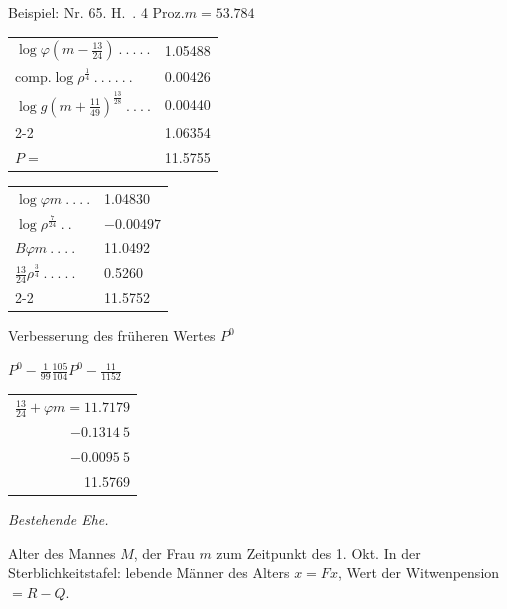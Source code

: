 Beispiel: Nr. 65. H.\ . 4 Proz.\quad \(m=53.784\)
\begin{center}
\fontsize{8}{13}\selectfont\setlength{\tabcolsep}{2pt}
\begin{tabular}{ll}
\(\log\varphi(m-\tfrac{13}{24})\ .\ .\ .\ .\ .\)&1.05488\\
\(\text{comp.}\log\rho^{\frac{1}{4}}\ .\ .\ .\ .\ .\ .\)&0.00426\\
\(\log g(m+\tfrac{11}{49})^{\frac{13}{28}}\ .\ .\ .\ .\)&0.00440\\\cline{2-2}
&1.06354\\
\(P=\)&11.5755
\end{tabular}\qquad
\begin{tabular}{ll}
\(\log\varphi m\ .\ .\ .\ .\)&1.04830\\
\(\log\rho^{\frac{7}{24}}\ .\ .\)&\(-0.00497\)\\
\(B\varphi m\ .\ .\ .\ .\)&11.0492\\
\(\tfrac{13}{24}\rho^{\frac{3}{4}}\ .\ .\ .\ .\ .\)&0.5260\\\cline{2-2}
&11.5752
\end{tabular}\par\medskip
Verbesserung des früheren Wertes \(P^0\)\par\smallskip
\(P^0-\tfrac{1}{99}\tfrac{105}{104}P^0-\tfrac{11}{1152}\)\par\smallskip
\begin{tabular}{r}
\(\tfrac{13}{24}+\varphi m=11.7179\)\\
\(-0.1314\ 5\)\\
\(-0.0095\ 5\)\\\hline
11.5769
\end{tabular}
\end{center}

\begin{center}\textit{Bestehende Ehe.}\end{center}
\noindent\hspace*{1.2em} Alter des Mannes \(M\), der Frau \(m\) zum Zeitpunkt des 1. Okt. In der Sterblichkeitstafel: lebende Männer des Alters \(x=Fx\), Wert der Witwenpension \(=R-Q\).

